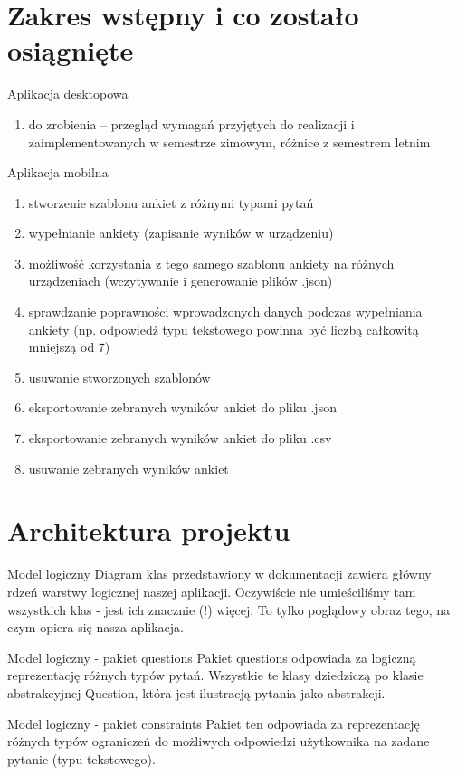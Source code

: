 \documentclass[a4paper,10pt]{beamer}
\begin{document}
	\section{Zakres wstępny i co zostało osiągnięte}
	
	
	\begin{frame}{Aplikacja desktopowa}
		
		\begin{enumerate}
			\item do zrobienia – przegląd wymagań przyjętych do realizacji i zaimplementowanych w semestrze zimowym, różnice z semestrem letnim
		\end{enumerate}
	\end{frame}
	
	\begin{frame}{Aplikacja mobilna}
		\begin{enumerate}
			\item	stworzenie szablonu ankiet z różnymi typami pytań 
			\item	wypełnianie ankiety (zapisanie wyników w urządzeniu)
			\item	możliwość korzystania z tego samego szablonu ankiety na różnych urządzeniach (wczytywanie i generowanie plików .json)
			\item	sprawdzanie poprawności wprowadzonych danych podczas wypełniania ankiety (np. odpowiedź typu tekstowego powinna być liczbą całkowitą mniejszą od 7) 
			\item	usuwanie stworzonych szablonów
			\item	eksportowanie zebranych wyników ankiet do pliku .json
			\item	eksportowanie zebranych wyników ankiet do pliku .csv
			\item	usuwanie zebranych wyników ankiet		
		\end{enumerate}
	\end{frame}
	
	
	\section{Architektura projektu}
	
	
	\begin{frame}{Model logiczny}
		Diagram klas przedstawiony w dokumentacji zawiera główny rdzeń warstwy logicznej naszej aplikacji. Oczywiście nie umieściliśmy tam wszystkich klas - jest ich znacznie (!) więcej. To tylko poglądowy obraz tego, na czym opiera się nasza aplikacja.
	\end{frame}
	\begin{frame}{Model logiczny - pakiet questions}
		Pakiet questions odpowiada za logiczną reprezentację różnych typów pytań. 	Wszystkie te klasy dziedziczą po klasie abstrakcyjnej Question, która jest ilustracją pytania jako abstrakcji.
	\end{frame}
	\begin{frame}{Model logiczny - pakiet constraints}
		Pakiet ten odpowiada za reprezentację różnych typów ograniczeń do możliwych odpowiedzi użytkownika na zadane pytanie (typu tekstowego).
		
	\end{frame}
	
\end{document}

